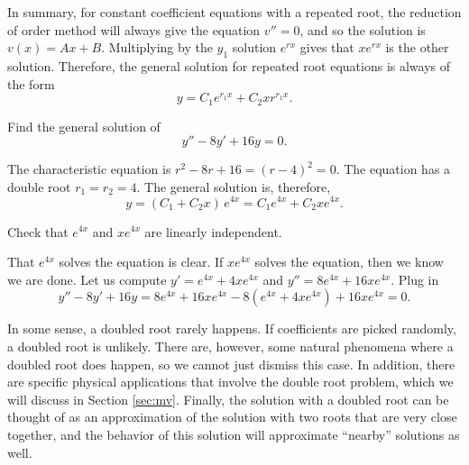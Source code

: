 \documentclass{ximera}
\begin{document}
In summary, for constant coefficient equations with a repeated root, the reduction of order method will always give the equation $v'' = 0$, and so the solution is $v(x) = Ax + B$. Multiplying by the $y_1$ solution $e^{rx}$ gives that $xe^{rx}$ is the other solution. Therefore, the general solution for repeated root equations is always of the form
\begin{equation*}
    y = C_1e^{r_1x} + C_2xr^{r_1x}.
\end{equation*}


\begin{example}
    Find the general solution of
    \begin{equation*}
        y'' -8 y' + 16 y = 0 .
    \end{equation*}
\end{example}

\begin{exampleSol}
    The characteristic equation is $r^2 - 8 r + 16 = {(r-4)}^2 = 0$. The equation has a  double root $r_1 = r_2 = 4$.  The general solution is, therefore,
    \begin{equation*}
        y = (C_1 + C_2 x)\, e^{4 x} = C_1 e^{4x} + C_2 x e^{4x} .
    \end{equation*}
    
    \begin{exercise}
        Check that $e^{4x}$ and $x e^{4x}$ are linearly independent.
    \end{exercise}
    
    That $e^{4x}$ solves the equation is clear.  If $x e^{4x}$ solves the equation, then we know we are done.  Let us compute $y' = e^{4x} + 4xe^{4x}$ and $y'' = 8 e^{4x} + 16xe^{4x}$.  Plug in
    \begin{equation*}
        y'' - 8 y' + 16 y =  8 e^{4x} + 16xe^{4x} - 8(e^{4x} + 4xe^{4x}) + 16 xe^{4x} = 0 .
    \end{equation*}
\end{exampleSol}

In some sense, a doubled root rarely happens.  If coefficients are picked randomly, a doubled root is unlikely. There are, however, some natural phenomena where a doubled root does happen, so we cannot just dismiss this case. In addition, there are specific physical applications that involve the double root problem, which we will discuss in Section \ref{sec:mv}. Finally, the solution with a doubled root can be thought of as an approximation of the solution with two roots that are very close together, and the behavior of this solution will approximate ``nearby'' solutions as well. 
\end{document}
